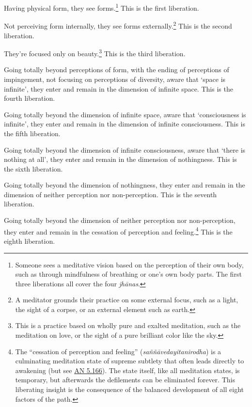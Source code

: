 \documentclass[12pt,openany]{book}%
\begin{document}
Having physical form, they see forms.\footnote{Someone sees a meditative vision based on the perception of their own body, such as through mindfulness of breathing or one’s own body parts. The first three liberations all cover the four \textit{\textsanskrit{jhānas}}. } This is the first liberation. 

Not perceiving form internally, they see forms externally.\footnote{A meditator grounds their practice on some external focus, such as a light, the sight of a corpse, or an external element such as earth. } This is the second liberation. 

They’re focused only on beauty.\footnote{This is a practice based on wholly pure and exalted meditation, such as the meditation on love, or the sight of a pure brilliant color like the sky. } This is the third liberation. 

Going totally beyond perceptions of form, with the ending of perceptions of impingement, not focusing on perceptions of diversity, aware that ‘space is infinite’, they enter and remain in the dimension of infinite space. This is the fourth liberation. 

Going totally beyond the dimension of infinite space, aware that ‘consciousness is infinite’, they enter and remain in the dimension of infinite consciousness. This is the fifth liberation. 

Going totally beyond the dimension of infinite consciousness, aware that ‘there is nothing at all’, they enter and remain in the dimension of nothingness. This is the sixth liberation. 

Going totally beyond the dimension of nothingness, they enter and remain in the dimension of neither perception nor non-perception. This is the seventh liberation. 

Going totally beyond the dimension of neither perception nor non-perception, they enter and remain in the cessation of perception and feeling.\footnote{The “cessation of perception and feeling” (\textit{\textsanskrit{saññāvedayitanirodha}}) is a culminating meditation state of supreme subtlety that often leads directly to awakening (but see \href{https://suttacentral.net/an5.166/en/sujato}{AN 5.166}). The state itself, like all meditation states, is temporary, but afterwards the defilements can be eliminated forever. This liberating insight is the consequence of the balanced development of all eight factors of the path. } This is the eighth liberation. 
\end{document}
